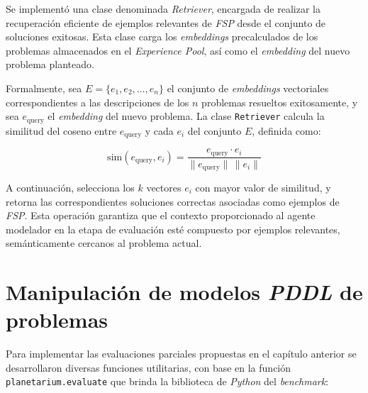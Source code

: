 Se implementó una clase denominada \textit{Retriever}, encargada de realizar la recuperación eficiente de ejemplos relevantes de \textit{FSP} desde el conjunto de soluciones exitosas. Esta clase carga los \textit{embeddings} precalculados de los problemas almacenados en el \textit{Experience Pool}, así como el \textit{embedding} del nuevo problema planteado.

Formalmente, sea $E = \{e_1, e_2, \ldots, e_n\}$ el conjunto de \textit{embeddings} vectoriales correspondientes a las descripciones de los $n$ problemas resueltos exitosamente, y sea $e_{\text{query}}$ el \textit{embedding} del nuevo problema. La clase \texttt{Retriever} calcula la similitud del coseno entre $e_{\text{query}}$ y cada $e_i$ del conjunto $E$, definida como:

\[
\text{sim}(e_{\text{query}}, e_i) = \frac{e_{\text{query}} \cdot e_i}{\|e_{\text{query}}\| \, \|e_i\|}
\]

A continuación, selecciona los $k$ vectores $e_i$ con mayor valor de similitud, y retorna las correspondientes soluciones correctas asociadas como ejemplos de \textit{FSP}. Esta operación garantiza que el contexto proporcionado al agente modelador en la etapa de evaluación esté compuesto por ejemplos relevantes, semánticamente cercanos al problema actual.

\section{Manipulación de modelos \textit{PDDL} de problemas}

Para implementar las evaluaciones parciales propuestas en el capítulo anterior se desarrollaron diversas funciones utilitarias, con base en la función \texttt{planetarium.evaluate} que brinda la biblioteca de \textit{Python} del \textit{benchmark}:

